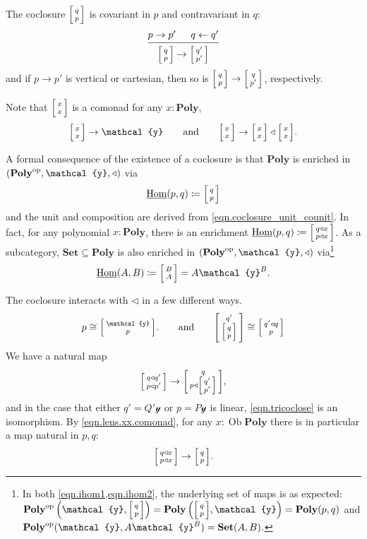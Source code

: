 \documentclass[11pt, one side, article]{memoir}
\makeatletter
\theoremstyle{definition}
\theoremstyle{plain}
\renewcommand{\ss}{\subseteq}
\DeclareMathOperator{\Hom}{Hom}
\DeclareMathOperator{\ob}{Ob}
\newcommand{\iHom}{\ul{\Hom}}
\newcommand{\Cat}[1]{\mathbf{#1}}%
\newcommand{\from}{\leftarrow}
\newcommand{\op}{^\tn{op}}
\newcommand{\tn}[1]{\textnormal{#1}}
\newcommand{\ul}[1]{\underline{#1}}
\newcommand{\smset}{\Cat{Set}}
\newcommand{\yon}{{\mathcal{y}}}
\newcommand{\poly}{\Cat{Poly}}
\newcommand{\0}{\textsf{0}}
\newcommand{\1}{\tn{\textsf{1}}}
\newcommand{\tri}{\mathbin{\triangleleft}}
\newcommand{\biglens}[2]{
     \begin{bmatrix}{\vphantom{f_f^f}#2} \\ {\vphantom{f_f^f}#1} \end{bmatrix}
}
\newcommand{\littlelens}[2]{
     \begin{bsmallmatrix}{\vphantom{f}#2} \\ {\vphantom{f}#1} \end{bsmallmatrix}
}
\newcommand{\lens}[2]{
  \relax\if@display
     \biglens{#1}{#2}
  \else
     \littlelens{#1}{#2}
  \fi
}
\newcommand{\hh}[2][]{#1 \tn{#2} #1}
\newcommand{\qqand}{\hh[\qquad]{and}}
\makeatother
\begin{document}
The coclosure $\lens{p}{q}$ is covariant in $p$ and contravariant in $q$:
\begin{equation}
  \begin{prooftree}
  	\Hypo{p\to p'}
  	\Hypo{q\from q'}
    \Infer2{\lens{p}{q}\to\lens{p'}{q'}}
  \end{prooftree}
\end{equation}
and if $p\to p'$ is vertical or cartesian, then so is $\lens{p}{q}\to\lens{p'}{q}$, respectively. 

Note that $\lens{x}{x}$ is a comonad for any $x:\poly$,
\begin{equation}\label{eqn.lens.xx.comonad}
	\lens{x}{x}\to\yon
	\qqand
	\lens{x}{x}\to\lens{x}{x}\tri\lens{x}{x}.
\end{equation}

A formal consequence of the existence of a coclosure is that $\poly$ is enriched in $(\poly\op,\yon,\tri)$ via
\begin{equation}\label{eqn.ihom1}
	\iHom(p,q)\coloneqq\lens{p}{q}
\end{equation}
and the unit and composition are derived from \eqref{eqn.coclosure_unit_counit}. In fact, for any polynomial $x:\poly$, there is an enrichment $\iHom(p,q)\coloneqq\lens{p\tri x}{q\tri x}$. As a subcategory, $\smset\ss\poly$ is also enriched in $(\poly\op,\yon,\tri)$ via\footnote{
In both \cref{eqn.ihom1,eqn.ihom2}, the underlying set of maps is as expected:
$
\poly\op\left(\yon,\lens{p}{q}\right)=\poly\left(\lens{p}{q},\yon\right)=\poly(p,q)
$ and
$
\poly\op(\yon,A\yon^B)=\smset(A,B).
$
}
\begin{equation}\label{eqn.ihom2}
	\iHom(A,B)\coloneqq\lens{A}{B}=A\yon^B.
\end{equation}

The coclosure interacts with $\tri$ in a few different ways.
\begin{equation}\label{eqn.lens_tri}
	p\cong\lens{p}{\yon}.
	\qqand
	\lens{\lens{p}{q}}{q'}\cong\lens{p}{q'\tri q}
\end{equation}
We have a natural map
\begin{equation}\label{eqn.tricoclose}
	\lens{p\tri p'}{q\tri q'}\to \lens{p\tri\lens{p'}{q'}}{q},
\end{equation}
and in the case that either $q'=Q'\yon$ or $p=P\yon$ is linear, \eqref{eqn.tricoclose} is an isomorphism. By \eqref{eqn.lens.xx.comonad}, for any $x:\ob\poly$ there is in particular a map natural in $p,q$:
\begin{equation}
\lens{p\tri x}{q\tri x}\to\lens{p}{q}.
\end{equation}
\end{document}
